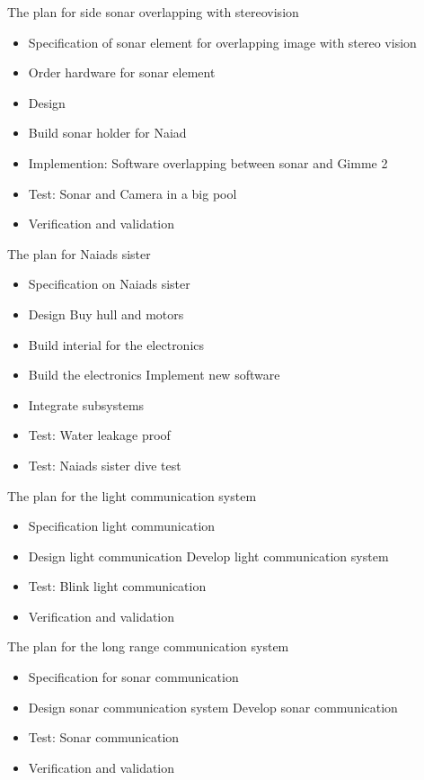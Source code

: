 \documentclass[a4paper, 10pt]{article} %
\begin{document}
The plan for side sonar overlapping with stereovision
\begin{itemize}
\item Specification of sonar element for overlapping image with stereo vision
\item Order hardware for sonar element
\item Design
\item Build sonar holder for Naiad
\item Implemention: Software overlapping between sonar and Gimme 2
\item Test: Sonar and Camera in a big pool
\item Verification and validation
\end{itemize}

The plan for Naiads sister
\begin{itemize}
\item Specification on Naiads sister
\item Design
\Item Buy hull and motors
\item Build interial for the electronics
\item Build the electronics
\Item Implement new software
\item Integrate subsystems
\item Test: Water leakage proof
\item Test: Naiads sister dive test
\end{itemize}

The plan for the light communication system
\begin{itemize}
\item Specification light communication
\item Design light communication
\Item Develop light communication system
\item Test: Blink light communication
\item Verification and validation
\end{itemize}

The plan for the long range communication system
\begin{itemize}
\item Specification for sonar communication
\item Design sonar communication system
\Item Develop sonar communication
\item Test: Sonar communication
\item Verification and validation
\end{itemize}
\end{document}
